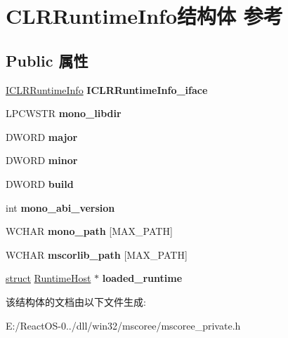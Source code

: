 \hypertarget{struct_c_l_r_runtime_info}{}\section{C\+L\+R\+Runtime\+Info结构体 参考}
\label{struct_c_l_r_runtime_info}
\subsection*{Public 属性}
\begin{DoxyCompactItemize}
\item 
\mbox{\label{struct_c_l_r_runtime_info_aee41a5d5c333c74fb0abb3c7d44c30d7}} 
\hyperlink{interface_i_c_l_r_runtime_info}{I\+C\+L\+R\+Runtime\+Info} {\bfseries I\+C\+L\+R\+Runtime\+Info\+\_\+iface}
\item 
\mbox{\label{struct_c_l_r_runtime_info_ae927cbbd49d59bb016b07e02df3ac078}} 
L\+P\+C\+W\+S\+TR {\bfseries mono\+\_\+libdir}
\item 
\mbox{\label{struct_c_l_r_runtime_info_a1a0371ce7e5b52de1d4ed210980af43e}} 
D\+W\+O\+RD {\bfseries major}
\item 
\mbox{\label{struct_c_l_r_runtime_info_a14ad7eabd96c672e5fe16f87a96b275b}} 
D\+W\+O\+RD {\bfseries minor}
\item 
\mbox{\label{struct_c_l_r_runtime_info_a707aa3f5215af29ac0b6d441a8593b16}} 
D\+W\+O\+RD {\bfseries build}
\item 
\mbox{\label{struct_c_l_r_runtime_info_acefc00ce3492d2a78fcdb808cb5dc836}} 
int {\bfseries mono\+\_\+abi\+\_\+version}
\item 
\mbox{\label{struct_c_l_r_runtime_info_abb401ba48dc716173f2f08bfc1cd346e}} 
W\+C\+H\+AR {\bfseries mono\+\_\+path} \mbox{[}M\+A\+X\+\_\+\+P\+A\+TH\mbox{]}
\item 
\mbox{\label{struct_c_l_r_runtime_info_a7766b1c67b6d5151f1cdd592cdc1f4f3}} 
W\+C\+H\+AR {\bfseries mscorlib\+\_\+path} \mbox{[}M\+A\+X\+\_\+\+P\+A\+TH\mbox{]}
\item 
\mbox{\label{struct_c_l_r_runtime_info_a7a1652c38241dcbb4c80c86242acad88}} 
\hyperlink{interfacestruct}{struct} \hyperlink{struct_runtime_host}{Runtime\+Host} $\ast$ {\bfseries loaded\+\_\+runtime}
\end{DoxyCompactItemize}


该结构体的文档由以下文件生成\+:\begin{DoxyCompactItemize}
\item 
E\+:/\+React\+O\+S-\/0../dll/win32/mscoree/mscoree\+\_\+private.\+h\end{DoxyCompactItemize}
